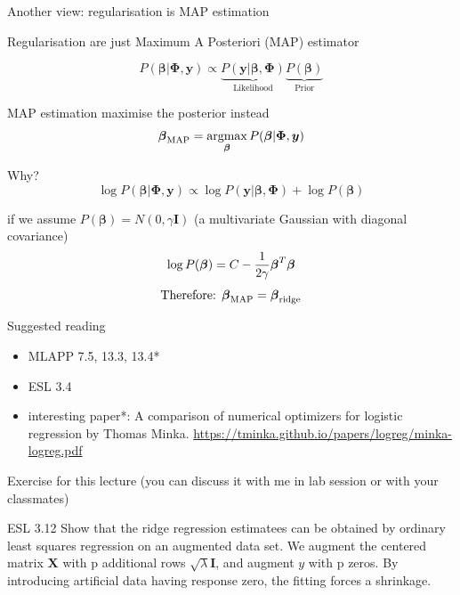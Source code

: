 \documentclass[ignorenonframetext,aspectratio=169]{beamer}
\providecommand{\tightlist}{%
  \setlength{\itemsep}{0pt}\setlength{\parskip}{0pt}}
\newcommand{\argmax}{\operatornamewithlimits{argmax}}
\newcommand{\vv}[1]{\boldsymbol{#1}}
\begin{document}
\begin{frame}{Another view: regularisation is MAP estimation}
\protect\hypertarget{another-view-regularisation-is-map-estimation}{}

Regularisation are just Maximum A Posteriori (MAP) estimator

\[P(\vv{\beta}|\vv{\Phi}, \vv{y}) \propto \underbrace{P(\vv{y}|\vv{\beta}, \vv{\Phi})}_{\text{Likelihood}} \underbrace{P(\vv{\beta})}_{\text{Prior}}\]

MAP estimation maximise the posterior instead
\[\vv{\beta}_{\text{MAP}} = \argmax_{\vv{\beta}}  P(\vv{\beta}|\vv{\Phi}, \vv{y})\]

Why?
\[\log P(\vv{\beta}|\vv{\Phi}, \vv{y}) \propto \log {P(\vv{y}|\vv{\beta}, \vv{\Phi})}+ \log  {P(\vv{\beta})}\]

if we assume \(P(\vv{\beta}) = N(0, \gamma \vv{I})\) \footnotesize (a
multivariate Gaussian with diagonal covariance)
\[\normalsize \log P(\vv{\beta}) = C - \frac{1}{2\gamma}\vv{\beta}^T\vv{\beta} \]
\[\normalsize \text{Therefore: } \vv{\beta}_{\text{MAP}} =\vv{\beta}_{\text{ridge}}\]

\end{frame}

\begin{frame}{Suggested reading}
\protect\hypertarget{suggested-reading}{}

\begin{itemize}
\tightlist
\item
  MLAPP 7.5, 13.3, 13.4*
\item
  ESL 3.4
\item
  interesting paper*: A comparison of numerical optimizers for logistic
  regression by Thomas Minka.
  \url{https://tminka.github.io/papers/logreg/minka-logreg.pdf}
\end{itemize}

\bigskip

\small Exercise for this lecture (you can discuss it with me in lab
session or with your classmates)

ESL 3.12 Show that the ridge regression estimatees can be obtained by
ordinary least squares regression on an augmented data set. We augment
the centered matrix \(\vv{X}\) with p additional rows
\(\sqrt{\lambda}\vv{I}\), and augment \(y\) with p zeros. By introducing
artificial data having response zero, the fitting forces a shrinkage.

\end{frame}
\end{document}
